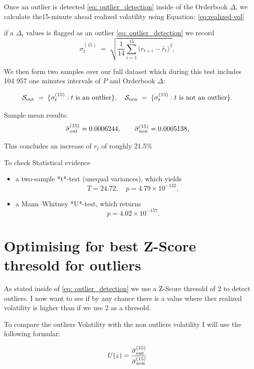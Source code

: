\documentclass[12pt]{article}
\begin{document}
Once an outlier is detected \eqref{eq: outlier_detection} inside of the Orderbook $\Delta$, we calculate the15-minute ahead realized volatility using Equation: \eqref{eq:realized-vol}




if a $\Delta_t$ values is flagged as an outlier \eqref{eq: outlier_detection}
we record
$$
\sigma^{(15)}_t
\;=\;
\sqrt{\frac{1}{14}\sum_{i=1}^{15}\bigl(r_{t+i}-\bar r_{t}\bigr)^{2}},
$$

We then form two samples over our full dataset which during this test includes 104 957 one minutes intervals of $P$ and Orderbook $\Delta$:


$$
\mathcal{S}_{\rm out} \;=\;\{\sigma^{(15)}_t : t\text{ is an outlier}\},
\quad
\mathcal{S}_{\rm non} \;=\;\{\sigma^{(15)}_t : t\text{ is not an outlier}\}.
$$


Sample mean results:
$$
\overline{\sigma}^{(15)}_{\rm out}
=0.0006244,
\qquad
\overline{\sigma}^{(15)}_{\rm non}
=0.0005138,
$$




This concludes an increase of $r_t$ of roughly 21.5\%


To check Statistical evidence

\begin{itemize}
  \item a two-sample *t*-test (unequal variances), which yields
  $$
    T=24.72,\quad p=4.79\times10^{-132},
  $$
  \item a Mann–Whitney *U*-test, which returns
  $$
    p=4.02\times10^{-157}.
  $$
\end{itemize}


\newpage

\section{Optimising for best Z-Score thresold for outliers}

As stated inside of \eqref{eq: outlier_detection} we use a Z-Score thresold of 2 to detect outliers. I now want to 
see if by any chance there is a value where ther realized volatility is higher than if we use 2 as a thresold.

To compare the outliers Volatility with the non outliers volatility I will use the following formular:

\begin{equation}\label{eq:vol_ratio}
U(z) =\frac{ \overline{\sigma}^{(15)}_{\rm out}}{\overline{\sigma}^{(15)}_{\rm non}}
\end{equation}
\end{document}
